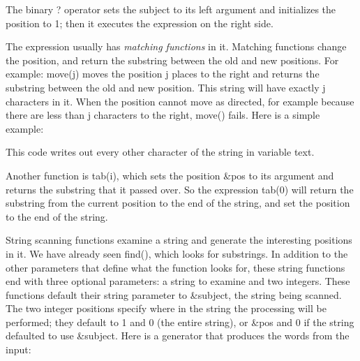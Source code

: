 The binary \textsf{?} operator sets the subject to its left argument and
initializes the position to 1; then it executes the expression on the
right side.

The expression usually has \textit{matching
functions} in it. Matching functions change the position, and return
the substring between the old and new positions. For example:
\textsf{move(j)}\textsf{ }moves the position \textsf{j} places to the
right and returns the substring between the old and new position. This
string will have exactly \textsf{j} characters in it. When the position
cannot move as directed, for example because there are less than
\textsf{j} characters to the right, \textsf{move()}
fails. Here is a simple example:


This code writes out every other character of the string in variable
\textsf{text}.

Another function is \textsf{tab(i)}, which sets the
position \textsf{\&pos} to its argument and returns the substring that
it passed over. So the expression \textsf{tab(0)} will return the
substring from the current position to the end of the string, and set
the position to the end of the string.

String scanning functions examine a string and generate the interesting
positions in it. We have already seen \textsf{find()},
which looks for substrings. In addition to the other parameters that
define what the function looks for, these string functions end with
three optional parameters: a string to examine and two integers. These
functions default their string
parameter to \textsf{\&subject}, the string being scanned. The two
integer positions specify where in the string the processing will be
performed; they default to 1 and 0 (the entire string), or
\textsf{\&pos} and 0 if the string defaulted to use \textsf{\&subject}.
Here is a generator that produces the words from the
input:


